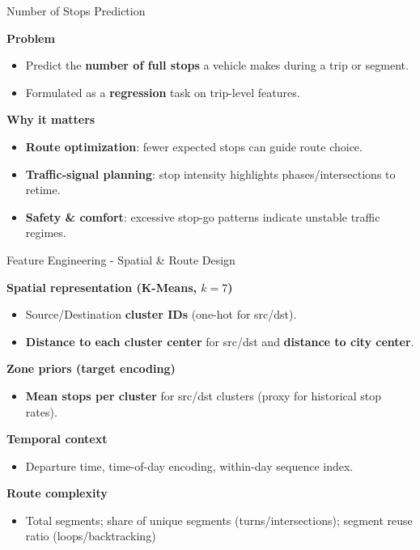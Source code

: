 \documentclass[aspectratio=169,11pt]{beamer}
\begin{document}
\begin{frame}{Number of Stops Prediction}

    \textbf{Problem}
    \begin{itemize}
        \item Predict the \textbf{number of full stops} a vehicle makes during a trip or segment.
        \item Formulated as a \textbf{regression} task on trip-level features.
    \end{itemize}

    \vspace{0.6em}
    \textbf{Why it matters}
    \begin{itemize}
        \item \textbf{Route optimization}: fewer expected stops can guide route choice.
        \item \textbf{Traffic-signal planning}: stop intensity highlights phases/intersections to retime.
        \item \textbf{Safety \& comfort}: excessive stop-go patterns indicate unstable traffic regimes.
    \end{itemize}
\end{frame}
\begin{frame}{Feature Engineering - Spatial \& Route Design}

    \textbf{Spatial representation (K-Means, $k{=}7$)}
    \begin{itemize}
        \item Source/Destination \textbf{cluster IDs} (one-hot for src/dst).
        \item \textbf{Distance to each cluster center} for src/dst and \textbf{distance to city center}.
    \end{itemize}

    \vspace{0.6em}
    \textbf{Zone priors (target encoding)}
    \begin{itemize}
        \item \textbf{Mean stops per cluster} for src/dst clusters (proxy for historical stop rates).
    \end{itemize}

    \vspace{0.6em}
    \textbf{Temporal context}
    \begin{itemize}
        \item Departure time, time-of-day encoding, within-day sequence index.
    \end{itemize}

    \vspace{0.6em}
    \textbf{Route complexity}
    \begin{itemize}
        \item Total segments; share of unique segments (turns/intersections); segment reuse ratio (loops/backtracking)
    \end{itemize}
\end{frame}
\end{document}
